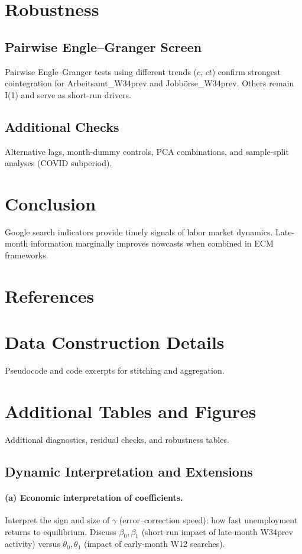 \documentclass[11pt,a4paper]{article}
\begin{document}
\section{Robustness}
\subsection{Pairwise Engle--Granger Screen}
Pairwise Engle--Granger tests using different trends ($c$, $ct$) confirm strongest cointegration for Arbeitsamt\_W34prev and Jobbörse\_W34prev. Others remain I(1) and serve as short-run drivers.

\subsection{Additional Checks}
Alternative lags, month-dummy controls, PCA combinations, and sample-split analyses (COVID subperiod).

\section{Conclusion}
Google search indicators provide timely signals of labor market dynamics. Late-month information marginally improves nowcasts when combined in ECM frameworks.

\section*{References}



\appendix
\section{Data Construction Details}
Pseudocode and code excerpts for stitching and aggregation.

\section{Additional Tables and Figures}
Additional diagnostics, residual checks, and robustness tables.

\subsection{Dynamic Interpretation and Extensions}

\paragraph{(a) Economic interpretation of coefficients.}
Interpret the sign and size of $\gamma$ (error–correction speed): how fast unemployment returns to equilibrium.
Discuss $\beta_0,\beta_1$ (short-run impact of late-month W34prev activity)
versus $\theta_0,\theta_1$ (impact of early-month W12 searches).
\end{document}
